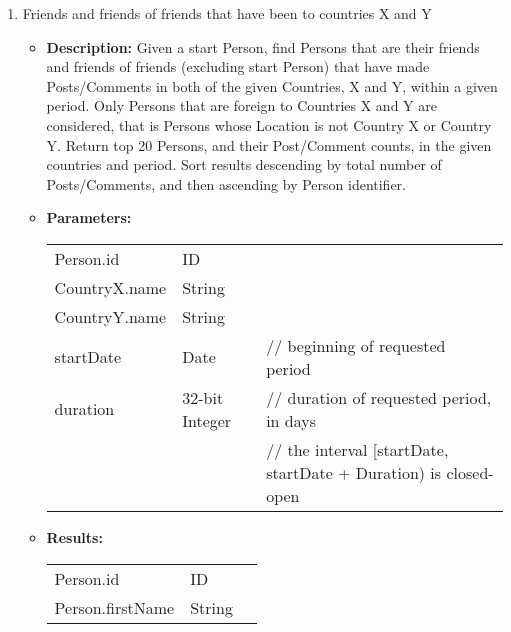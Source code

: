 {\begin{enumerate}
                \item Friends and friends of friends that have been to countries X and Y
                    \begin{itemize}
                        \item \textbf{Description:}
                            Given a start Person, find Persons that are their friends and
                            friends of friends (excluding start Person) that have made
                            Posts/Comments in both of the given Countries, X and Y, within a
                            given period.  Only Persons that are foreign to Countries X and Y
                            are considered, that is Persons whose Location is not Country X or
                            Country Y.  Return top 20 Persons, and their Post/Comment counts,
                            in the given countries and period.  Sort results descending by
                            total number of Posts/Comments, and then ascending by Person
                            identifier.
                        \item \textbf{Parameters:} \\
                            \begin{tabular}{lll}
                                Person.id 										& ID & \\
                                CountryX.name									& String & \\
                                CountryY.name									& String & \\
                                startDate										& Date 	& // beginning of requested period \\
                                duration										& 32-bit Integer 					& // duration of requested period, in days \\
                                                  &                                   & // the interval [startDate, startDate + Duration) is closed-open\\
                            \end{tabular}		
                        \item \textbf{Results:} \\
                            \begin{tabular}{lll}
                                Person.id 										& ID 	& \\
                                Person.firstName 								& String 			& \\

\end{tabular}
\end{itemize}
\end{enumerate}}
